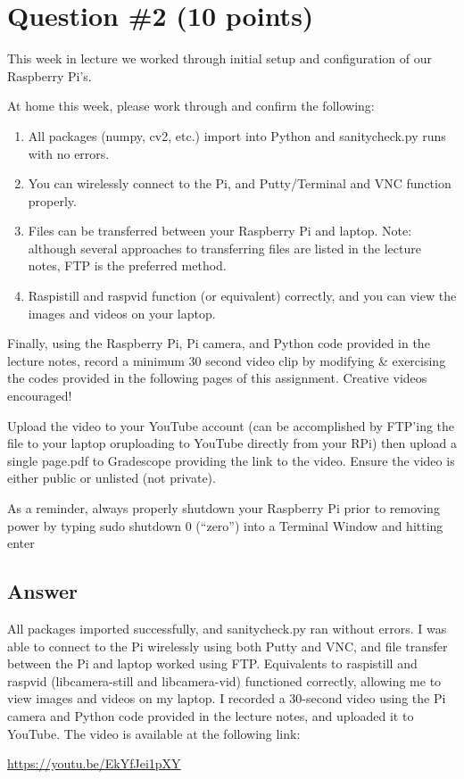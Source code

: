 \documentclass[11pt]{article}
\begin{document}
\section*{Question \#2 (10 points)}

This week in lecture we worked through initial setup and configuration of our Raspberry Pi’s.

At home this week, please work through and confirm the following:

\begin{enumerate}
    \item All packages (numpy, cv2, etc.) import into Python and sanitycheck.py runs with no errors.
    \item You can wirelessly connect to the Pi, and Putty/Terminal and VNC function properly.
    \item Files can be transferred between your Raspberry Pi and laptop. Note: although several
    approaches to transferring files are listed in the lecture notes, FTP is the preferred method.
    \item Raspistill and raspvid function (or equivalent) correctly, and you can view the images and videos on your laptop.
\end{enumerate}

Finally, using the Raspberry Pi, Pi camera, and Python code provided in the lecture notes, record a minimum 30 second video clip by modifying \& exercising the codes provided in the following pages of this assignment. Creative videos encouraged!

Upload the video to your YouTube account (can be accomplished by FTP’ing the file to your laptop oruploading to YouTube directly from your RPi) then upload a single page.pdf to Gradescope providing the link to the video. Ensure the video is either public or unlisted (not private).

As a reminder, always properly shutdown your Raspberry Pi prior to removing power by typing sudo shutdown 0 (“zero”) into a Terminal Window and hitting enter

\subsection*{Answer}

All packages imported successfully, and sanitycheck.py ran without errors. I was able to connect to the Pi wirelessly using both Putty and VNC, and file transfer between the Pi and laptop worked using FTP. Equivalents to raspistill and raspvid (libcamera-still and libcamera-vid) functioned correctly, allowing me to view images and videos on my laptop. I recorded a 30-second video using the Pi camera and Python code provided in the lecture notes, and uploaded it to YouTube. The video is available at the following link:

\url{https://youtu.be/EkYfJei1pXY}
\end{document}
